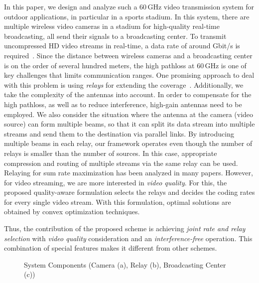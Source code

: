 \documentclass[conference]{IEEEtran}
\begin{document}
In this paper, we design and analyze such a 60\,GHz video transmission system for outdoor applications, in particular in a sports stadium.
In this system, there are multiple wireless video cameras in a stadium for high-quality real-time broadcasting, all send their signals to a broadcasting center.
To transmit uncompressed HD video streams in real-time, a data rate of around  Gbit/s is required~\cite{kim11pimrc}.
Since the distance between wireless cameras and a broadcasting center is on the order of several hundred meters, the high pathloss at 60\,GHz is one of key challenges that limits communication ranges.
One promising approach to deal with this problem is using \textit{relays} for extending the coverage~\cite{kim11pimrc}.
Additionally, we take the complexity of the antennas into account. In order to compensate for the high pathloss, as well as to reduce interference, high-gain antennas need to be employed. We also consider the situation where the antenna at the camera (video source) can form multiple beams, so that it can split its data stream into multiple streams and send them to the destination via parallel links.
By introducing multiple beams in each relay, our framework operates even though the number of relays is smaller than the number of sources.
In this case, appropriate compression and routing of multiple streams via the same relay can be used.
Relaying for sum rate maximization has been analyzed in many papers. However, for video streaming, we are more interested in {\em video quality}. For this, the proposed quality-aware formulation selects the relays and decides the coding rates for every single video stream. With this formulation, optimal solutions are obtained by convex optimization techniques.

Thus, the contribution of the proposed scheme is achieving \textit{joint rate and relay selection} with \textit{video quality} consideration and an \textit{interference-free} operation. This combination of special features makes it different from other schemes.

\begin{figure*}[t!]
	\centering
	\caption{System Components (Camera (a), Relay (b), Broadcasting Center (c))}
	\label{fig:sysmodule}
\end{figure*}
\end{document}
